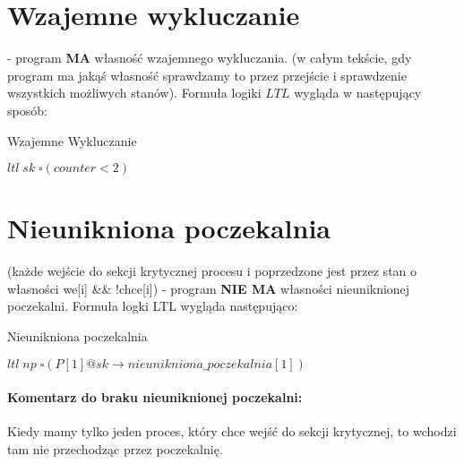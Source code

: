 \documentclass[oneside]{book}
\begin{document}
 

\section{Wzajemne wykluczanie} - program \textbf{MA} własność wzajemnego wykluczania. (w całym tekście, gdy program ma jakąś własność sprawdzamy to przez przejście i sprawdzenie wszystkich możliwych stanów). Formuła logiki $LTL$ wygląda w następujący sposób:




 \begin{algorithm}[H]                                                            
   \caption{Wzajemne Wykluczanie}\label{euclid}
   \begin{algorithmic}[1]                                                         
     \State $ltl \; sk \; { \square (counter < 2)}$ 
  \end{algorithmic}                                                             
\end{algorithm}   




\section{Nieunikniona poczekalnia} (każde wejście do sekcji krytycznej procesu i poprzedzone jest przez stan o własności we[i] \&\& !chce[i]) - program \textbf{NIE MA} własności nieuniknionej poczekalni. Formuła logki LTL wygląda następująco:
 \begin{algorithm}[H]                                                            
   \caption{Nieunikniona poczekalnia}\label{euclid}
   \begin{algorithmic}[1]                                                         
     \State $ltl \; np \; { \square (P[1]@sk \rightarrow nieunikniona\_poczekalnia[1])} $ 
  \end{algorithmic}                                                             
\end{algorithm} 

\paragraph{Komentarz do braku nieuniknionej poczekalni:}
Kiedy mamy tylko jeden proces, który chce wejść do sekcji krytycznej, to wchodzi tam nie przechodząc przez poczekalnię.
\end{document}
